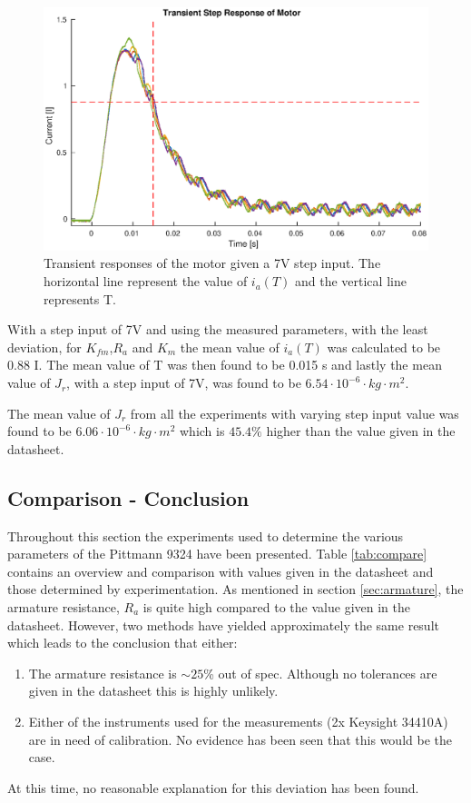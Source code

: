 \begin{figure}[!h]
	\centering
	\includegraphics[width=\linewidth]{graphics/transient_response_inertia}
	\caption{Transient responses of the motor given a 7V step input. The horizontal line represent the value of $i_a(T)$ and the vertical line represents T.}
	\label{fig:inertia_trans_plot}
\end{figure}

With a step input of 7V and using the measured parameters, with the least deviation, for $K_{fm}$,$R_a$ and $K_m$ the mean value of $i_a(T)$ was calculated to be 0.88 I. 
The mean value of T was then found to be 0.015 s and lastly the mean value of $J_r$, with a step input of 7V, was found to be $6.54 \cdot 10^{-6} \cdot kg \cdot m^2$.

\par
The mean value of $J_r$ from all the experiments with varying step input value was found to be $ 6.06 \cdot 10^{-6} \cdot kg \cdot m^2$ which is $45.4\%$ higher than the value given in the datasheet. 

\subsection{Comparison - Conclusion}
Throughout this section the experiments used to determine the various parameters of the Pittmann 9324 have been presented.
Table \ref{tab:compare} contains an overview and comparison with values given in the datasheet and those determined by experimentation.
As mentioned in section \ref{sec:armature}, the armature resistance, $R_a$ is quite high compared to the value given in the datasheet.
However, two methods have yielded approximately the same result which leads to the conclusion that either:
\begin{enumerate}
	\item The armature resistance is $\sim25$\% out of spec. 
	Although no tolerances are given in the datasheet this is highly unlikely.
	\item Either of the instruments used for the measurements (2x Keysight 34410A) are in need of calibration. 
	No evidence has been seen that this would be the case.
\end{enumerate}
At this time, no reasonable explanation for this deviation has been found.

